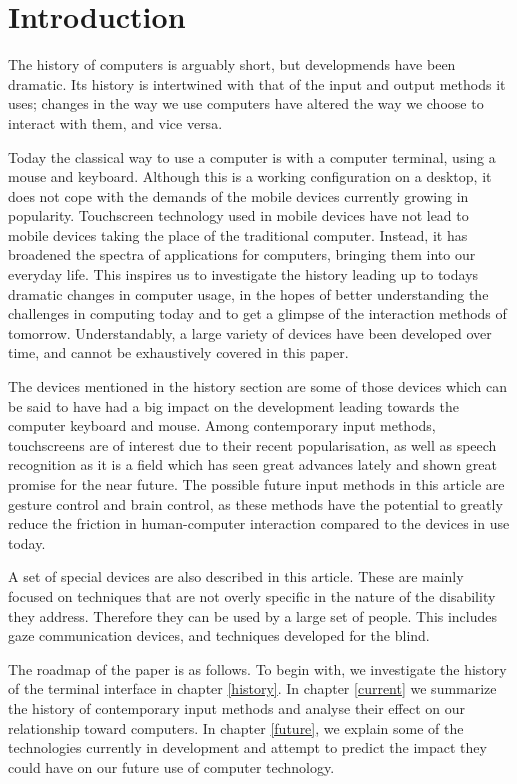 
\section{Introduction}

The history of computers is arguably short, but developmends have been dramatic. Its history is intertwined with that of the input and output methods it uses; changes in the way we use computers have altered the way we choose to interact with them, and vice versa. 

Today the classical way to use a computer is with a computer terminal, using a mouse and keyboard. Although this is a working configuration on a desktop, it does not cope with the demands of the mobile devices currently growing in popularity. Touchscreen technology used in mobile devices have not lead to mobile devices taking the place of the traditional computer. Instead, it has broadened the spectra of applications for computers, bringing them into our everyday life. This inspires us to investigate the history leading up to todays dramatic changes in computer usage, in the hopes of better understanding the challenges in computing today and to get a glimpse of the interaction methods of tomorrow. Understandably, a large variety of devices have been developed over time, and cannot be exhaustively covered in this paper.

The devices mentioned in the history section are some of those devices which can be said to have had a big impact on the development leading towards the computer keyboard and mouse. Among contemporary input methods, touchscreens are of interest due to their recent popularisation, as well as speech recognition as it is a field which has seen great advances lately and shown great promise for the near future. The possible future input methods in this article are gesture control and brain control, as these methods have the potential to greatly reduce the friction in human-computer interaction compared to the devices in use today.

A set of special devices are also described in this article. These are mainly focused on techniques that are not overly specific in the nature of the disability they address. Therefore they can be used by a large set of people. This includes gaze communication devices, and techniques developed for the blind.

The roadmap of the paper is as follows. To begin with, we investigate the history of the terminal interface in chapter \ref{history}. In chapter \ref{current} we summarize the history of contemporary input methods and analyse their effect on our relationship toward computers. In chapter \ref{future}, we explain some of the technologies currently in development and attempt to predict the impact they could have on our future use of computer technology.
